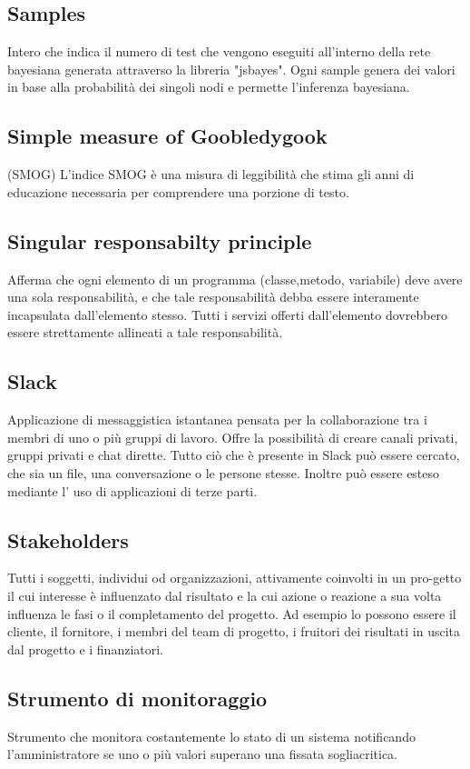     \subsection*{Samples}
Intero che indica il numero di test che vengono eseguiti all'interno della rete bayesiana generata attraverso la libreria "jsbayes". Ogni sample genera dei valori in base alla probabilità dei singoli nodi e permette l'inferenza bayesiana.
    \subsection*{Simple measure of Goobledygook}
(SMOG) L’indice SMOG è una misura di leggibilità che stima gli anni di educazione necessaria per comprendere una porzione di testo.
    \subsection*{Singular responsabilty principle}
Afferma che ogni elemento di un programma (classe,metodo, variabile) deve avere una sola responsabilità, e che tale responsabilità debba essere interamente incapsulata dall’elemento stesso. Tutti i servizi offerti dall’elemento dovrebbero essere strettamente allineati a tale responsabilità.
    \subsection*{Slack}
Applicazione di messaggistica istantanea pensata per la collaborazione tra i membri di uno o più gruppi di lavoro.  Offre la possibilità di creare canali privati, gruppi privati e chat dirette. Tutto ciò che è presente in Slack può essere cercato, che sia un file, una conversazione o le persone stesse. Inoltre può essere esteso mediante l’ uso di applicazioni di terze parti.
    \subsection*{Stakeholders}
Tutti i soggetti, individui od organizzazioni, attivamente coinvolti in un pro-getto il cui interesse è influenzato dal risultato e la cui azione o reazione a sua volta influenza le fasi o il completamento del progetto.  Ad esempio lo possono essere il cliente, il fornitore, i membri del team di progetto, i fruitori dei risultati in uscita dal progetto e i finanziatori.
    \subsection*{Strumento di monitoraggio}
Strumento che monitora costantemente lo stato di un sistema notificando l’amministratore se uno o più valori superano una fissata sogliacritica.
\newpage

